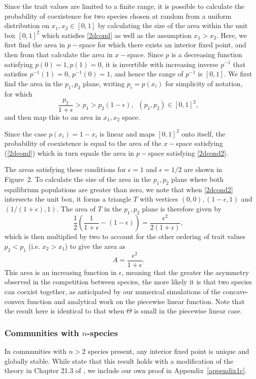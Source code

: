 Since the trait values are limited to a finite range, it is possible to calculate the probability of coexistence for two species chosen at random from a uniform distribution on $x_1,x_2 \in [0,1]$  by calculating the size of the area within the unit box $[0,1]^2$ which satisfies \eqref{2dcond} as well as the assumption $x_1>x_2$. Here, we first find the area in $p-$space for which there exists an interior fixed point, and then from that calculate the area in $x-$space. Since $p$ is a decreasing function satisfying $p(0)=1, p(1)=0$, it is invertible with increasing inverse $p^{-1}$ that satisfies $p^{-1}(1)=0, \, p^{-1}(0)=1$, and hence the range of $p^{-1}$ is $[0,1]$. We first find the area in the $p_1,p_2$ plane, writing $p_i=p(x_i)$ for simplicity of notation, for which
\begin{equation}
\label{2dcond2}
\frac{p_2}{1+\epsilon}>p_1>p_2(1-\epsilon),\;\; (p_1,p_2)\in [0,1]^2,
\end{equation}
and then map this to an area in $x_1,x_2$ space.


Since the case $p(x_i)=1-x_i$ is linear and maps $[0,1]^2$ onto itself, the probability of coexistence is equal to the area of the $x-$space satisfying (\ref{2dcond}) which in turn equals the area in $p-$space satisfying \eqref{2dcond2}.

The areas satisfying these conditions for $\epsilon=1$ and $\epsilon=1/2$ are shown in Figure~2. To calculate the size of the area in the $p_1,p_2$ plane where both equilibrium populations are greater than zero, we note that when \eqref{2dcond2} intersects the unit box, it forms a triangle $T$ with vertices $(0,0),(1-\epsilon,1)$ and $(1/(1+\epsilon),1)$. The area of $T$ in the $p_1,p_2$ plane is therefore given by
\[
\frac{1}{2}\left(\frac{1}{1+\epsilon}-(1-\epsilon)\right)=\frac{\epsilon^2}{2(1+\epsilon)},
\]
which is then multiplied by two to account for the other ordering of trait values $p_2<p_1$ (i.e. $x_2>x_1$) to give the area as
\[
A =\frac{\epsilon^2}{1+\epsilon}.
\]
This area is an increasing function in $\epsilon$, meaning that the greater the asymmetry observed in the competition between species, the more likely it is that two species can coexist together, as anticipated by our numerical simulations of the concave-convex function and analytical work on the piecewise linear function. Note that the result here is identical to that when $\Theta$ is small in the piecewise linear case.

 
\subsubsection{Communities with $n$-species}
In communities with $n>2$ species present,  any interior fixed point is unique and globally stable. While  \cite{nowak1994superinfection} state that this result holds with a modification of the theory in Chapter 21.3 of \cite{hofbauer1998evolutionary}, we include our own proof in Appendix~\ref{appendix1c}. 

